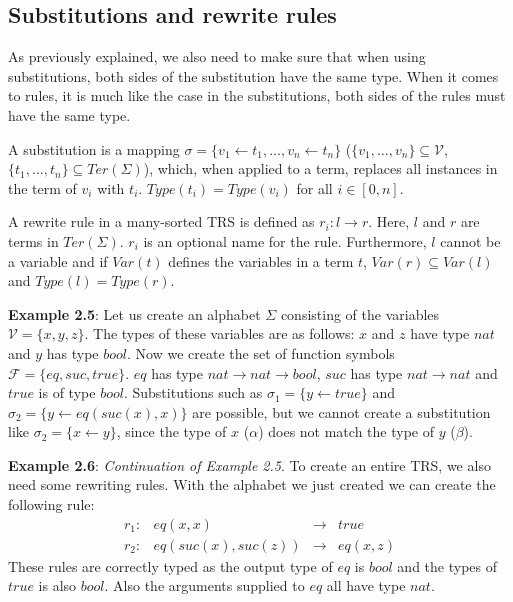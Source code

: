 \subsection{Substitutions and rewrite rules}
As previously explained, we also need to make sure that when using substitutions, both sides of the substitution have the same type. When it comes to rules, it is much like the case in the substitutions, both sides of the rules must have the same type.
\begin{definition}
A substitution is a mapping $\sigma = \{ v_1 \leftarrow t_1, \dots, v_n \leftarrow t_n \}$ ($\{ v_1, \dots, v_n \} \subseteq \mathcal{V}$, $\{ t_1, \dots, t_n\} \subseteq \textit{Ter}(\Sigma)$), which, when applied to a term, replaces all instances in the term of $v_i$ with $t_i$. $\textit{Type}(t_i) = \textit{Type}(v_i)$ for all $i \in [ 0, n ]$.
\end{definition}

\begin{definition}
A rewrite rule in a many-sorted TRS is defined as $r_i : l \rightarrow r$. Here, $l$ and $r$ are terms in $\textit{Ter}(\Sigma)$. $r_i$ is an optional name for the rule. Furthermore, $l$ cannot be a variable and if $\textit{Var}(t)$ defines the variables in a term $t$, $\textit{Var}(r) \subseteq \textit{Var}(l)$ and \textbf{$\textit{Type}(l) = \textit{Type}(r)$}. 
\end{definition}

\textbf{Example 2.5}: Let us create an alphabet $\Sigma$ consisting of the variables $\mathcal{V} = \{ x, y, z\}$. The types of these variables are as follows: $x$ and $z$ have type $nat$ and $y$ has type $bool$. Now we create the set of function symbols $\mathcal{F} = \{ eq, suc, true \}$. $eq$ has type $nat \rightarrow nat \rightarrow bool$, $suc$ has type $nat \rightarrow nat$ and $true$ is of type $bool$. Substitutions such as $\sigma_1 = \{ y \leftarrow true \}$ and $\sigma_2 = \{ y \leftarrow eq(suc(x), x) \}$ are possible, but we cannot create a substitution like $\sigma_2 = \{ x \leftarrow y \}$, since the type of $x$ ($\alpha$) does not match the type of $y$ ($\beta$).

\textbf{Example 2.6}: \textit{Continuation of Example 2.5}. To create an entire TRS, we also need some rewriting rules. With the alphabet we just created we can create the following rule: 
$$
\begin{array}{lrcl}
    r_1: & eq(x, x) & \rightarrow & true \\
    r_2: & eq(suc(x), suc(z)) & \rightarrow & eq(x, z)
\end{array}
$$
These rules are correctly typed as the output type of $eq$ is $bool$ and the types of $true$ is also $bool$. Also the arguments supplied to $eq$ all have type $nat$. 


